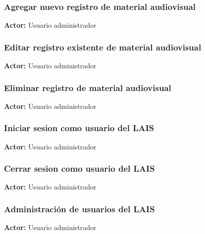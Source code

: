 \documentclass[10pt,letterpaper]{article}
\begin{document}
\subsubsection{Agregar nuevo registro de material audiovisual}
\textbf{Actor:} Usuario administrador

\subsubsection{Editar registro existente de material audiovisual}
\textbf{Actor:} Usuario administrador

\subsubsection{Eliminar registro de material audiovisual}
\textbf{Actor:} Usuario administrador

\subsubsection{Iniciar sesion como usuario del LAIS}
\textbf{Actor:} Usuario administrador

\subsubsection{Cerrar sesion como usuario del LAIS}
\textbf{Actor:} Usuario administrador

\subsubsection{Administración de usuarios del LAIS}
\textbf{Actor:} Usuario administrador

\end{document}
